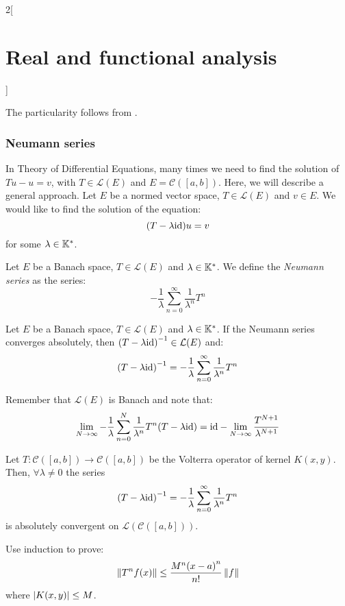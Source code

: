 \documentclass[../../../main_math.tex]{subfiles}
\begin{document}
\begin{multicols}{2}[\section{Real and functional analysis}]
\begin{sproof}
    The particularity follows from .
  \end{sproof}
  \subsubsection{Neumann series}
  \begin{remark}
    In Theory of Differential Equations, many times we need to find the solution of $Tu-u=v$, with $T\in\mathcal{L}(E)$ and $E=\mathcal{C}([a,b])$. Here, we will describe a general approach. Let $E$ be a normed vector space, $T\in\mathcal{L}(E)$ and $v\in E$. We would like to find the solution of the equation: $$(T-\lambda\mathrm{id})u=v$$ for some $\lambda\in\mathbb{K}^*$.
  \end{remark}
  \begin{definition}
    Let $E$ be a Banach space, $T\in\mathcal{L}(E)$ and $\lambda\in\mathbb{K}^*$. We define the \emph{Neumann series} as the series:
    $$-\frac{1}{\lambda}\sum_{n= 0}^\infty\frac{1}{\lambda^n}T^n$$
  \end{definition}
  \begin{theorem}
    Let $E$ be a Banach space, $T\in\mathcal{L}(E)$ and $\lambda\in\mathbb{K}^*$. If the Neumann series converges absolutely, then ${(T-\lambda\mathrm{id})}^{-1}\in\mathcal{L}(E)$ and: $${(T-\lambda\mathrm{id})}^{-1}=-\frac{1}{\lambda}\sum_{n= 0}^\infty\frac{1}{\lambda^n}T^n$$
  \end{theorem}
  \begin{sproof}
    Remember that $\mathcal{L}(E)$ is Banach and note that:
    $$\lim_{N\to\infty}-\frac{1}{\lambda}\sum_{n= 0}^N\frac{1}{\lambda^n}T^n(T-\lambda\mathrm{id})=\mathrm{id}-\lim_{N\to\infty}\frac{T^{N+1}}{\lambda^{N+1}}$$
  \end{sproof}
  \begin{theorem}
    Let $T:\mathcal{C}([a,b])\rightarrow\mathcal{C}([a,b])$ be the Volterra operator of kernel $K(x,y)$. Then, $\forall \lambda\ne 0$ the series
    $${(T-\lambda\mathrm{id})}^{-1}=-\frac{1}{\lambda}\sum_{n= 0}^\infty\frac{1}{\lambda^n}T^n$$
    is absolutely convergent on $\mathcal{L}(\mathcal{C}([a,b]))$.
  \end{theorem}
  \begin{sproof}
    Use induction to prove: $$\left\|T^nf(x)\right\|\leq \frac{M^n{(x-a)}^n}{n!}\left\|f\right\|$$
    where $\abs{K(x,y)}\leq M$.
  \end{sproof}

\end{multicols}
\end{document}
